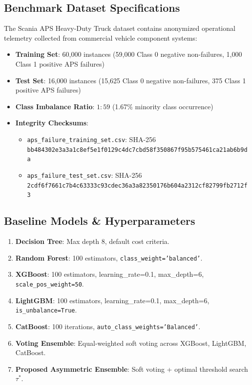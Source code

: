 \documentclass[conference]{IEEEtran}
\begin{document}
\subsection{Benchmark Dataset Specifications}
The Scania APS Heavy-Duty Truck dataset contains anonymized operational telemetry collected from commercial vehicle component systems:
\begin{itemize}
    \item \textbf{Training Set}: 60,000 instances (59,000 Class 0 negative non-failures, 1,000 Class 1 positive APS failures)
    \item \textbf{Test Set}: 16,000 instances (15,625 Class 0 negative non-failures, 375 Class 1 positive APS failures)
    \item \textbf{Class Imbalance Ratio}: $1:59$ (1.67\% minority class occurrence)
    \item \textbf{Integrity Checksums}:
    \begin{itemize}
        \item \texttt{aps\_failure\_training\_set.csv}: SHA-256 \texttt{bb484302e3a3a1c8ef5e1f0129c4dc7cbd58f350867f95b575461ca21ab6b9da}
        \item \texttt{aps\_failure\_test\_set.csv}: SHA-256 \texttt{2cdf6f7661c7b4c63333c93cdec36a3a82350176b604a2312cf82799fb2712f3}
    \end{itemize}
\end{itemize}

\subsection{Baseline Models \& Hyperparameters}
\begin{enumerate}
    \item \textbf{Decision Tree}: Max depth 8, default cost criteria.
    \item \textbf{Random Forest}: 100 estimators, \texttt{class\_weight='balanced'}.
    \item \textbf{XGBoost}: 100 estimators, learning\_rate=0.1, max\_depth=6, \texttt{scale\_pos\_weight=50}.
    \item \textbf{LightGBM}: 100 estimators, learning\_rate=0.1, max\_depth=6, \texttt{is\_unbalance=True}.
    \item \textbf{CatBoost}: 100 iterations, \texttt{auto\_class\_weights='Balanced'}.
    \item \textbf{Voting Ensemble}: Equal-weighted soft voting across XGBoost, LightGBM, CatBoost.
    \item \textbf{Proposed Asymmetric Ensemble}: Soft voting + optimal threshold search $\tau^*$.
\end{enumerate}
\end{document}
